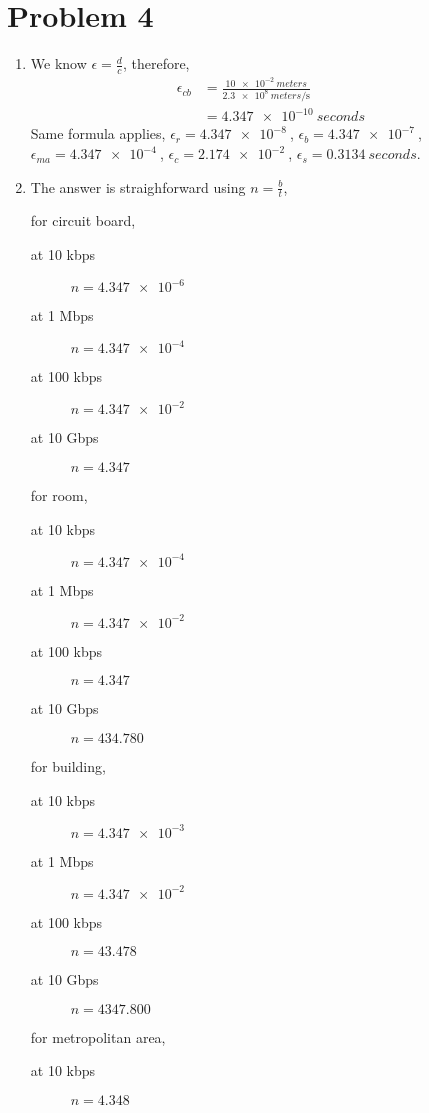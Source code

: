 \documentclass{article}
\begin{document}
\section*{Problem 4}
	\begin{enumerate}
		\item We know $\epsilon = \frac{d}{c}$, therefore,
			\begin{align*}
				\epsilon_{cb} &= \frac{\SI{10e-2}{meters}}{\SI{2.3e8}{meters\per\second}} \\
											&= \SI{4.347e-10}{seconds}
			\end{align*}
			Same formula applies, $\epsilon_{r} = \SI{4.347e-8}{}$,
			$\epsilon_{b} = \SI{4.347e-7}{}$,
			$\epsilon_{ma} = \SI{4.347e-4}{}$,
			$\epsilon_{c} = \SI{2.174e-2}{}$,
			$\epsilon_{s} = \SI{0.3134}{seconds}$.
		\item The answer is straighforward using $n = \frac{b}{t}$,
				\begin{addmargin}[1em]{1em}
					for circuit board,
					\begin{description}
						\item [at 10 kbps] $n = \SI{4.347e-6}{}$
						\item [at 1 Mbps] $n = \SI{4.347e-4}{}$
						\item [at 100 kbps] $n = \SI{4.347e-2}{}$
						\item [at 10 Gbps] $n = \SI{4.347}{}$
					\end{description}
					for room,
					\begin{description}
						\item [at 10 kbps] $n = \SI{4.347e-4}{}$
						\item [at 1 Mbps] $n = \SI{4.347e-2}{}$
						\item [at 100 kbps] $n = \SI{4.347}{}$
						\item [at 10 Gbps] $n = \SI{434.780}{}$
					\end{description}
					for building,
					\begin{description}
						\item [at 10 kbps] $n = \SI{4.347e-3}{}$
						\item [at 1 Mbps] $n = \SI{4.347e-2}{}$
						\item [at 100 kbps] $n = \SI{43.478}{}$
						\item [at 10 Gbps] $n = \SI{4347.800}{}$
					\end{description}
					for metropolitan area,
					\begin{description}
						\item [at 10 kbps] $n = \SI{4.348}{}$

\end{description}
\end{addmargin}
\end{enumerate}
\end{document}
